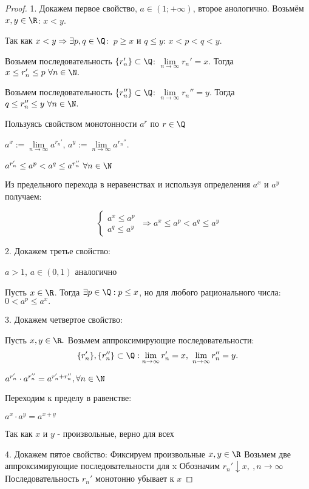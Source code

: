 \begin{proof} 

1. Докажем первое свойство, $a \in (1; +\infty)$, второе анологично. Возьмём $x, y \in \R$: $x < y$.

Так как $x < y \Rightarrow \exists p, q \in \Q$: $\ p \geq x$ и $ q \leq y$: $x < p < q < y.$
    
Возьмем последовательность $\{r_{n}'\} \subset \Q$: $\lim\limits_{n\to \infty} r_{n}' = x$. Тогда $x \leq r_n' \leq p  \ \forall n \in \N.$
        
Возьмем последовательность $\{r_{n}''\} \subset \Q$: $\lim\limits_{n\to \infty} r_{n}'' = y$. Тогда $q \leq r_n'' \leq y \ \forall n \in \N.$
        
Пользуясь свойством монотонности $a^r$ по $r \in \Q$ \newline
        
$a^{x} := \lim\limits_{n \to \infty} a^{r_{n}'}$, $a^{y} := \lim\limits_{n \to \infty} a^{r_{n}''}$.
    
$a^{r_{n}'} \leq a^{p} < a^{q} \leq a^{r_{n}''} \ \forall n \in \N$
    
Из предельного перехода в неравенствах и используя определения $a^x$ и $a^y$ получаем:
    
$$ 
\left\{
\begin{array}{l}
    a^x \leq a^p\\ 
    a^q \leq a^y
\end{array}
\right.
\ \Rightarrow a^x \leq a^p < a^q \leq a^y
$$
    
2. Докажем третье свойство:
    
$a > 1$, $a \in (0, 1)$ аналогично
    
Пусть $x \in \R$. Тогда $\exists p \in \Q: p \leq x$, но для любого рационального числа: $0 < a^p \leq a^x.$

3. Докажем четвертое свойство:
    
Пусть $x, y \in \R.$ Возьмем аппроксимирующие последовательности:
$$\{r_{n}'\}, \{r_{n}''\} \subset \Q : \lim\limits_{n\to \infty} r_{n}' = x, \  \lim\limits_{n\to \infty} r_{n}'' = y .$$
    
$a^{r_n'}\cdot a^{r_n''} = a^{r_n' + r_n''}, \forall n \in \N$
    
Переходим к пределу в равенстве:
    
$a^{x}\cdot a^{y} = a^{x + y}$
    
Так как $x$ и $y$ - произвольные, верно для всех

4. Докажем пятое свойство:
Фиксируем произвольные $x,y \in \R$
Возьмем две аппроксимирующие последовательности для x \newline
Обозначим $r_{n}' \downarrow x, \ , n \to \infty$ Последовательность $r_n'$ монотонно убывает к $x$
    

\end{proof}
